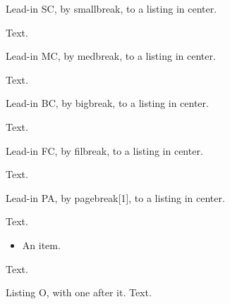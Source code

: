 Lead-in SC, by smallbreak, to a listing in center.\label{sc}
\smallbreak
\begin{center}
\end{center}
Text.

Lead-in MC, by medbreak, to a listing in center.\label{mc}
\medbreak
\begin{center}
\end{center}
Text.

Lead-in BC, by bigbreak, to a listing in center.\label{bc}
\bigbreak
\begin{center}
\end{center}
Text.

Lead-in FC, by filbreak, to a listing in center.\label{fc}
\filbreak
\begin{center}
\end{center}
Text.

Lead-in PA, by pagebreak[1], to a listing in center.\label{pa}
\pagebreak[1]
\begin{center}
\end{center}
Text.

\begin{itemize}\item An item.\label{t}\end{itemize}
Text.

Listing O, with one after it.\label{o}
Text.

\clearpage
{}
\makeatletter
\ifdefined\nwbegincode{}\fi
{}
\makeatother
{}

